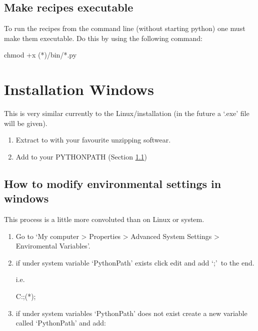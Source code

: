 \subsection{Make recipes executable}
\label{ch:install:installunix:executable}

\noindent To run the recipes from the command line (without starting python) one must make them executable. Do this by using the following command:
\begin{cmdbox}
chmod +x (*\InstallDIRcmd*)/bin/*.py
\end{cmdbox}



\clearpage
\newpage
\section{Installation Windows}
\label{ch:install:install_win}

This is very similar currently to the Linux/\mac installation (in the future a `.exe' file will be given).

\begin{enumerate}
\item Extract to \InstallDIR with your favourite unzipping softwear.
\item Add \InstallDIR to your PYTHONPATH (Section \ref{ch:install:install_win:environ_settings})
\end{enumerate}

\subsection{How to modify environmental settings in windows}
\label{ch:install:install_win:environ_settings}

This process is a little more convoluted than on Linux or \mac system.

\begin{enumerate}
\item Go to `My computer > Properties > Advanced System Settings > Enviromental Variables'.

\item if under system variable `PythonPath' exists click edit and add `\InstallDIR;'\, to the end.

\noindent i.e.

\begin{textbox}
C:;(*\InstallDIR*);
\end{textbox}

\item if under system variables `PythonPath' does not exist create a new variable called `PythonPath' and add:

\begin{textbox}
\end{textbox}

\end{enumerate}

